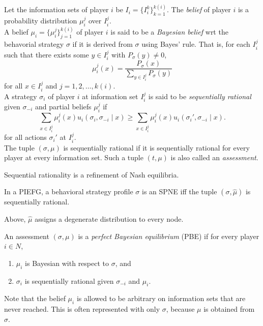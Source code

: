 		\begin{fdef}
			Let the information sets of player $i$ be $I_i = \{ I_i^k \}_{k=1}^{k(i)}$. The \emph{belief} of player $i$ is a probability distribution $\mu_i^j$ over $I_i^j$.\\
			A belief $\mu_i = \{\mu_i^j\}_{j=1}^{k(i)}$ of player $i$ is said to be a \emph{Bayesian belief} wrt the behavorial strategy $\sigma$ if it is derived from $\sigma$ using Bayes' rule. That is, for each $I_i^j$ such that there exists some $y \in I_i^j$ with $P_\sigma(y) \ne 0$,
			\[ \mu_i^j(x) = \frac{P_\sigma(x)}{\sum_{y \in I_i^j} P_\sigma(y)} \]
			for all $x \in I_i^j$ and $j = 1,2,\ldots,k(i)$.\\
			A strategy $\sigma_i$ of player $i$ at information set $I_i^j$ is said to be \emph{sequentially rational} given $\sigma_{-i}$ and partial beliefs $\mu_i^j$ if
			\[ \sum_{x \in I_i^j} \mu_i^j(x) u_i(\sigma_i,\sigma_{-i} \mid x) \ge \sum_{x \in I_i^j} \mu_i^j(x) u_i(\sigma_i',\sigma_{-i} \mid x). \]
			for all actions $\sigma_i'$ at $I_i^j$.\\
			The tuple $(\sigma,\mu)$ is sequentially rational if it is sequentially rational for every player at every information set. Such a tuple $(t,\mu)$ is also called an \emph{assessment}.
		\end{fdef}

		Sequential rationality is a refinement of Nash equilibria.

		\begin{fprop}
			In a PIEFG, a behavioral strategy profile $\sigma$ is an SPNE iff the tuple $(\sigma,\hat{\mu})$ is sequentially rational.
		\end{fprop}
		Above, $\hat{\mu}$ assigns a degenerate distribution to every node.

		\begin{fdef}
			An assessment $(\sigma,\mu)$ is a \emph{perfect Bayesian equilibrium} (PBE) if for every player $i \in N$,
			\begin{enumerate}
				\item $\mu_i$ is Bayesian with respect to $\sigma$, and
				\item $\sigma_i$ is sequentially rational given $\sigma_{-i}$ and $\mu_i$.
			\end{enumerate}
		\end{fdef}
		Note that the belief $\mu_i$ is allowed to be arbitrary on information sets that are never reached.
		This is often represented with only $\sigma$, because $\mu$ is obtained from $\sigma$.

